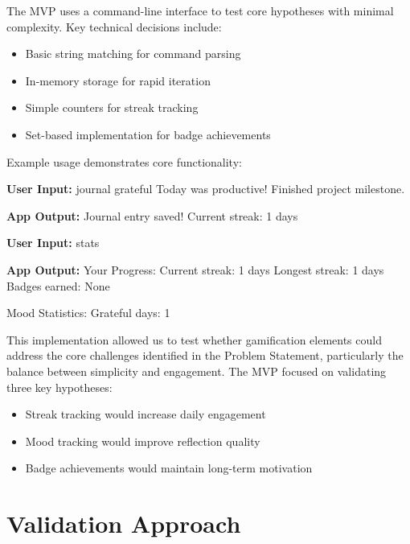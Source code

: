 \documentclass{article} %
\begin{document}
The MVP uses a command-line interface to test core hypotheses with minimal complexity. Key technical decisions include:

\begin{itemize}
    \item Basic string matching for command parsing
    \item In-memory storage for rapid iteration
    \item Simple counters for streak tracking
    \item Set-based implementation for badge achievements
\end{itemize}

Example usage demonstrates core functionality:

\begin{Userinput}
\textbf{User Input:} journal grateful Today was productive! Finished project milestone.
\end{Userinput}

\begin{Appoutput}
\textbf{App Output:} Journal entry saved! Current streak: 1 days
\end{Appoutput}

\begin{Userinput}
\textbf{User Input:} stats
\end{Userinput}

\begin{Appoutput}
\textbf{App Output:} Your Progress:
Current streak: 1 days
Longest streak: 1 days
Badges earned: None

Mood Statistics:
Grateful days: 1
\end{Appoutput}

This implementation allowed us to test whether gamification elements could address the core challenges identified in the Problem Statement, particularly the balance between simplicity and engagement. The MVP focused on validating three key hypotheses:

\begin{itemize}
    \item Streak tracking would increase daily engagement
    \item Mood tracking would improve reflection quality
    \item Badge achievements would maintain long-term motivation
\end{itemize}



\section{Validation Approach}
\label{sec:validation_approach}
\end{document}
